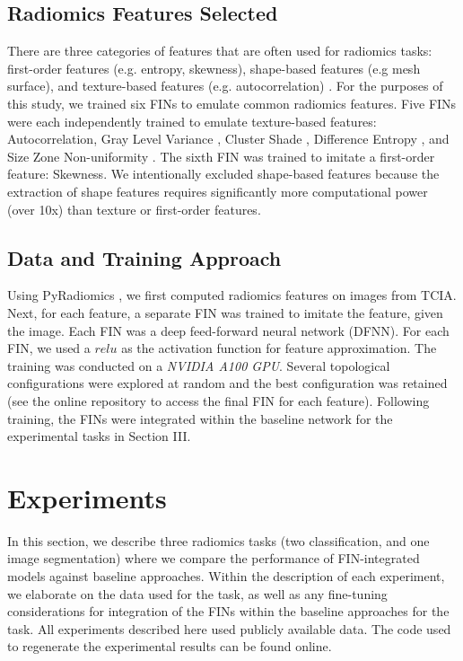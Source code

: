 \documentclass[conference]{IEEEtran}
\begin{document}
\subsection{Radiomics Features Selected} There are three categories of features that are often used for radiomics tasks: first-order features (e.g. entropy, skewness), shape-based features (e.g mesh surface), and texture-based features (e.g. autocorrelation) \cite{KUMAR20121234}. For the purposes of this study, we trained six FINs to emulate common radiomics features. Five FINs were each independently trained to emulate texture-based features: Autocorrelation\cite{moradmand2020impact}, Gray Level Variance \cite{simpson2020impact}, Cluster Shade \cite{gabelloni2020can}, Difference Entropy \cite{ogbonnaya2021prediction}, and Size Zone Non-uniformity \cite{wang2020radiomics}. The sixth FIN was trained to imitate a first-order feature: Skewness\cite{coppola2021heterogeneity}. We intentionally excluded shape-based features because the extraction of shape features requires significantly more computational power (over 10x) than texture or first-order features.

\subsection{Data and Training Approach} 

Using PyRadiomics \cite{van2017computational}, we first computed radiomics features on images from TCIA\cite{lungCT}. Next, for each feature, a separate FIN was trained to imitate the feature, given the image.  Each FIN was a deep feed-forward neural network (DFNN). For each FIN, we used a $relu$ as the activation function for feature approximation. The training was conducted on a \textit{NVIDIA A100 GPU}. Several topological configurations were explored at random and the best configuration was retained (see the online repository to access the final FIN for each feature). Following training, the FINs were integrated within the baseline network for the experimental tasks in Section III. 





\section{Experiments} \label{sec:Exp}
In this section, we describe three radiomics tasks (two classification, and one image segmentation) where we compare the performance of FIN-integrated models against baseline approaches. Within the description of each experiment, we elaborate on the data used for the task, as well as any fine-tuning considerations for integration of the FINs within the baseline approaches for the task. All experiments described here used publicly available data. The code used to regenerate the experimental results can be found online. 
\end{document}

